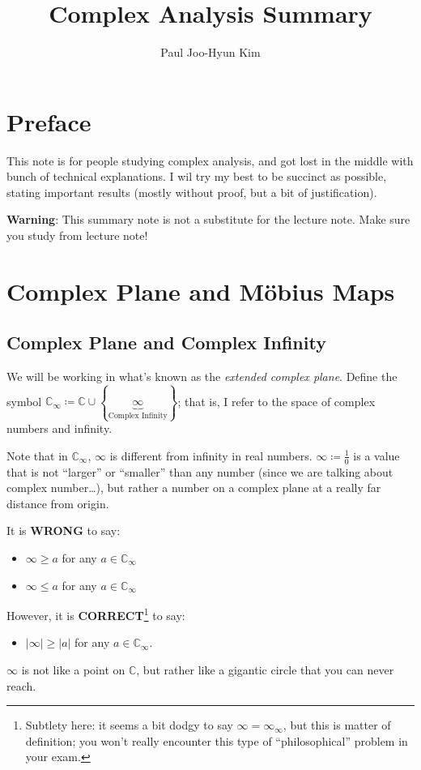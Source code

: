 \documentclass[a4paper, 12pt]{article}
\title{Complex Analysis Summary}
\author{Paul Joo-Hyun Kim}
\theoremstyle{definition}
\numberwithin{definition}{section}
\numberwithin{exercise}{section}
\numberwithin{remark}{section}
\numberwithin{figure}{section}
\newcommand{\C}{\mathbb{C}}
\begin{document}
\maketitle
\setcounter{section}{-1}
\section{Preface}
This note is for people studying complex analysis,
and got lost in the middle with bunch of technical explanations.
I wil try my best to be succinct as possible,
stating important results (mostly without proof, but a bit of justification).

\textbf{Warning}: This summary note is not a substitute for the lecture note.
Make sure you study from lecture note!

\section{Complex Plane and M\"obius Maps}
\subsection{Complex Plane and Complex Infinity}
We will be working in what's known as the \textit{extended complex plane}.
Define the symbol $\C_{\infty} \coloneqq \C \cup \left\{ \underbrace{\infty}_{\text{Complex Infinity}} \right\}$;
that is, I refer to the space of complex numbers
and infinity.

Note that in $\C_{\infty}$, $\infty$ is different from infinity in real numbers.
$\infty \coloneqq \frac{1}{0}$ is a value that is not ``larger'' or ``smaller'' than any number
(since we are talking about complex number\dots), but rather
a number on a complex plane at a really far distance from origin.

It is \textbf{WRONG} to say:
\begin{itemize}
    \item $\infty \geq a$ for any $a \in \C_{\infty}$
    \item $\infty \leq a$ for any $a \in \C_{\infty}$
\end{itemize}
However, it is \textbf{CORRECT}\footnote{
    Subtlety here: it seems a bit dodgy to say $\infty = \infty_{\infty}$,
    but this is matter of definition;
    you won't really encounter this type of ``philosophical'' problem
    in your exam.
} to say:
\begin{itemize}
    \item $|\infty| \geq |a|$ for any $a \in \C_{\infty}$.
\end{itemize}
$\infty$ is not like a point on $\C$, but rather like a gigantic circle that you can never reach.
\end{document}
